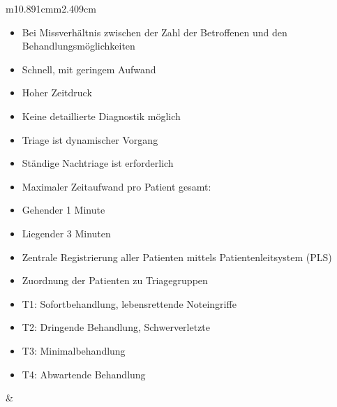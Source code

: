 \documentclass{article}
\begin{document}
\begin{center}
\tablehead{}\begin{supertabular}{m{10.891cm}m{2.409cm}}
\begin{itemize}
\item {\mdseries Bei Missverh\"altnis zwischen der Zahl der Betroffenen
und den Be\-handlungs\-m\"oglich\-keiten}

\item {\mdseries Schnell, mit geringem Aufwand}

\item {\mdseries Hoher Zeitdruck}

\item {\mdseries Keine detaillierte Diagnostik m\"oglich}

\item {\mdseries Triage ist dynamischer Vorgang}

\item {\mdseries St\"andige Nachtriage ist erforderlich}

\item {\mdseries Maximaler Zeitaufwand pro Patient gesamt:}

\end{itemize}
\begin{itemize}
\item {\mdseries Gehender 1 Minute}

\item {\mdseries Liegender 3 Minuten }

\end{itemize}
\begin{itemize}
\item {\mdseries Zentrale Registrierung aller Patienten mittels
Patientenleitsystem (PLS)}

\item {\mdseries Zuordnung der Patienten zu Triagegruppen}

\end{itemize}
\begin{itemize}
\item {\mdseries T1: Sofortbehandlung, lebensrettende Noteingriffe}

\item {\mdseries T2: Dringende Behandlung, Schwerverletzte}

\item {\mdseries T3: Minimalbehandlung}

\item {\mdseries T4: Abwartende Behandlung}

\end{itemize}
 &
{%
 \par}

\\
\end{supertabular}
\end{center}
\end{document}

